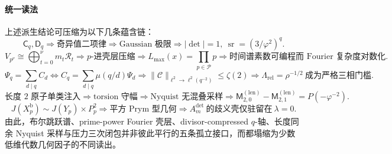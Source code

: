\paragraph{统一读法}
上述派生结论可压缩为以下几条蕴含链：
\[
\mathsf C_q,\mathsf D_q
\Longrightarrow
\text{奇异值二项律}
\Longrightarrow
\text{Gaussian 极限}
\Longrightarrow
|\det|=1,\ \operatorname{sr}=(3/\varphi^2)^q.
\]
\[
V_{p^\nu}\cong \bigoplus_{t=0}^{\nu}m_t\mathcal R_t
\Longrightarrow
\text{\(p\)-进壳层压缩}
\Longrightarrow
L_{\max}(x)=\prod_{p\in\mathcal P}p
\Longrightarrow
\text{时间谱素数可编程而 Fourier 复杂度对数化}.
\]
\[
\Psi_q=\sum_{d\mid q}C_d
\Longleftrightarrow
C_q=\sum_{d\mid q}\mu(q/d)\Psi_d
\Longrightarrow
\|\mathcal C\|_{\ell^2\to \ell^2(q^{-2})}\le \zeta(2)
\Longrightarrow
\Lambda_{\mathrm{rel}}=\rho^{-1/2}\ \text{成为严格三相门槛}.
\]
\[
\text{长度 \(2\) 原子单类注入}
\Longrightarrow
\text{torsion 守幅}
\Longrightarrow
\text{Nyquist 无混叠采样}
\Longrightarrow
\mathsf M_{2,0}^{(\mathrm{len})}-\mathsf M_{2,1}^{(\mathrm{len})}=P(-\varphi^{-2}).
\]
\[
J(X_p^{\mathrm b})\sim J(Y_p)\times P_p^2
\Longrightarrow
\text{平方 Prym 型几何}
\Longrightarrow
A_m^{\det}\ \text{的歧义壳仅驻留在}\ \lambda=0.
\]
由此，布尔跳跃谱、prime-power Fourier 壳层、divisor-compressed \(q\)-轴、长度同余 Nyquist 采样与压力三次闭包并非彼此平行的五条孤立接口，而都塌缩为少数低维代数几何因子的不同读出。
